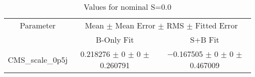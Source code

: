 \begin{table}
\centering
\caption{Values for nominal S=0.0}
\begin{tabular}{ccc}
\toprule
Parameter & \multicolumn{2}{c}{Mean $\pm$ Mean Error $\pm$ RMS $\pm$ Fitted Error}\\
 & B-Only Fit & S+B Fit\\
\midrule
CMS\_scale\_0p5j & \num{0.218276} $\pm$ \num{0} $\pm$ \num{0} $\pm$ \num{0.260791} & \num{-0.167505} $\pm$ \num{0} $\pm$ \num{0} $\pm$ \num{0.467009}\\
\bottomrule
\end{tabular}
\end{table}